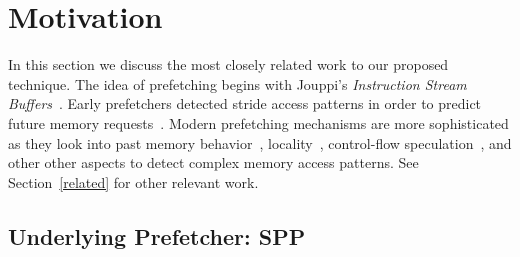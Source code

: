 \section{Motivation}
\label{Background}

In this section we discuss the most closely related work to our
proposed technique.  The idea of prefetching begins with Jouppi's
\textit{Instruction Stream Buffers}~\cite{ISB}. Early prefetchers
detected stride access patterns in order to predict future memory
requests~\cite{Smith,Baer,Stride}. Modern prefetching mechanisms are
more sophisticated as they look into past memory
behavior~\cite{Address_Correlated,AMPM},
locality~\cite{Spatial_Pattern,SMS,Temporal_Instruction_Fetch,Off_Chip,STMS,SMS_JILP},
control-flow speculation~\cite{BFetch,MTBFetch}, and other other
aspects to detect complex memory access patterns.  See
Section~\ref{related} for other relevant work.

\subsection{Underlying Prefetcher: SPP}
\label{Background-SPP}


